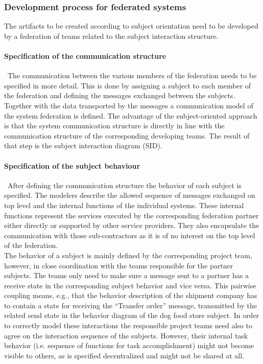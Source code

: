 \subsubsection{Development process for federated systems}
 The artifacts to be created according to subject orientation need to be developed by a federation of teams related to the subject interaction structure.

\paragraph{Specification of the communication structure}\
The communication between the various members of the federation needs to be specified in more detail. This is done by assigning a subject to each member of the federation and defining the messages exchanged between the subjects. Together with the data transported by the messages a communication model of the system federation is defined. The advantage of the subject-oriented approach is that the system communication structure is directly in line with the communication structure of the corresponding developing teams. The result of that step is the subject interaction diagram (SID).

\paragraph{Specification of the subject behaviour}\
After defining the communication structure the behavior of each subject is specified. The modelers describe the allowed sequence of messages exchanged on top level and the internal functions of the individual systems. These internal functions represent the services executed by the corresponding federation partner either directly or supported by other service providers. They also encapsulate the communication with those sub-contractors as it is of no interest on the top level of the federation.\\
The behavior of a subject is mainly defined by the corresponding project team, however, in close coordination with the teams responsible for the partner subjects. The teams only need to make sure a message sent to a partner has a receive state in the corresponding subject behavior and vice versa. This pairwise coupling means, e.g., that the behavior description of the shipment company has to contain a state for receiving the “Transfer order” message, transmitted by the related send state in the behavior diagram of the dog food store subject. In order to correctly model these interactions the responsible project teams need also to agree on the interaction sequence of the subjects. However, their internal task behavior (i.e. sequence of functions for task accomplishment) might not become visible to others, as is specified decentralized and might not be shared at all.

